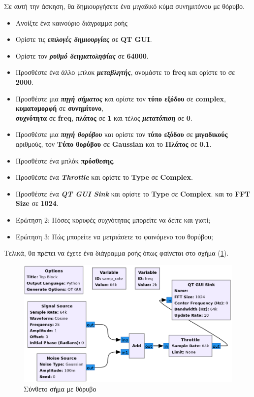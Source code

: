 \documentclass[12pt]{report}
\begin{document}
            Σε αυτή την άσκηση, θα δημιουργήσετε ένα μιγαδικό κύμα συνημιτόνου με θόρυβο.
            
            \begin{itemize}
                \item Ανοίξτε ένα καινούριο διάγραμμα ροής
                \item Ορίστε τις \textbf{\textit{επιλογές δημιουργίας}} σε \textbf{QT GUI}.
                \item Ορίστε τον \textbf{\textit{ρυθμό δειγματοληψίας}} σε \textbf{64000}.
                \item Προσθέστε ένα άλλο μπλοκ \textbf{\textit{μεταβλητής}}, 
                    ονομάστε το \textbf{freq} και ορίστε το σε \textbf{2000}.
                \item Προσθέστε μια \textbf{\textit{πηγή σήματος}} και ορίστε τον \textbf{τύπο εξόδου}
                σε \textbf{complex}, \textbf{κυματομορφή} σε \textbf{συνημίτονο},\\
                \textbf{συχνότητα} σε \textbf{freq}, \textbf{πλάτος} σε \textbf{1} και τέλος 
                \textbf{\textit{μετατόπιση}} σε \textbf{0}.
                \item Προσθέστε μια \textbf{\textit{πηγή θορύβου}} και ορίστε τον \textbf{τύπο εξόδου}
                    σε \textbf{μιγαδικούς} αριθμούς, τον \textbf{Τύπο θορύβου} σε \textbf{Gaussian} και το
                    \textbf{Πλάτος} σε \textbf{0.1}.
                \item Προσθέστε ένα μπλόκ \textbf{πρόσθεσης}.
                \item Προσθέστε ένα \textbf{\textit{Throttle}} και ορίστε το \textbf{Type} σε \textbf{Complex}.
                \item Προσθέστε ένα \textbf{\textit{QT GUI Sink}} και ορίστε το \textbf{Type} σε \textbf{Complex}.
                και το \textbf{FFT Size} σε \textbf{1024}.
                \item \textsf{Ερώτηση 2: Πόσες κορυφές συχνότητας μπορείτε να δείτε και γιατί;}
                \item \textsf{Ερώτηση 3: Πώς μπορείτε να μετριάσετε το φαινόμενο του θορύβου;}
            \end{itemize}

            Τελικά, θα πρέπει να έχετε ένα διάγραμμα ροής όπως φαίνεται στο σχήμα (\ref{fig:grcSourceWGN}).
            \begin{figure}[h]
                \centering
                \includegraphics[width=.8\textwidth]{ex2_flow.png}
                \caption{Σύνθετο σήμα με θόρυβο}
                \label{fig:grcSourceWGN}
            \end{figure}
\end{document}
